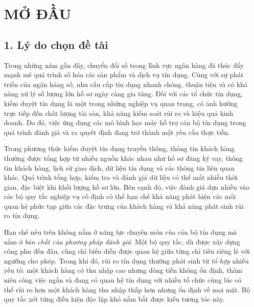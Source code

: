 \chapter*{MỞ ĐẦU}

\section*{1. Lý do chọn đề tài}

Trong những năm gần đây, chuyển đổi số trong lĩnh vực ngân hàng đã thúc đẩy mạnh
mẽ quá trình số hóa các sản phẩm và dịch vụ tín dụng. Cùng với sự phát triển của
ngân hàng số, nhu cầu cấp tín dụng nhanh chóng, thuận tiện và có khả năng xử lý
số lượng lớn hồ sơ ngày càng gia tăng. Đối với các tổ chức tín dụng, kiểm duyệt
tín dụng là một trong những nghiệp vụ quan trọng, có ảnh hưởng trực tiếp đến chất
lượng tài sản, khả năng kiểm soát rủi ro và hiệu quả kinh doanh. Do đó, việc ứng
dụng các mô hình học máy hỗ trợ cán bộ tín dụng trong quá trình đánh giá và ra
quyết định đang trở thành một yêu cầu thực tiễn.

Trong phương thức kiểm duyệt tín dụng truyền thống, thông tin khách hàng thường
được tổng hợp từ nhiều nguồn khác nhau như hồ sơ đăng ký vay, thông tin khách
hàng, lịch sử giao dịch, dữ liệu tín dụng và các thông tin liên quan khác. Quá
trình tổng hợp, kiểm tra và đánh giá dữ liệu có thể mất nhiều thời gian, đặc biệt
khi khối lượng hồ sơ lớn. Bên cạnh đó, việc đánh giá dựa nhiều vào các bộ quy tắc
nghiệp vụ cố định có thể hạn chế khả năng phát hiện các mối quan hệ phức tạp giữa
các đặc trưng của khách hàng và khả năng phát sinh rủi ro tín dụng.

Hạn chế nêu trên không nằm ở năng lực chuyên môn của cán bộ tín dụng mà nằm ở
\textit{bản chất của phương pháp đánh giá}. Một bộ quy tắc, dù được xây dựng công
phu đến đâu, cũng chỉ biểu diễn được quan hệ giữa từng chỉ tiêu riêng lẻ với
ngưỡng cho phép. Trong khi đó, rủi ro tín dụng thường phát sinh từ \textit{tổ
hợp} nhiều yếu tố: một khách hàng có thu nhập cao nhưng dòng tiền không ổn định,
thâm niên công việc ngắn và đang có quan hệ tín dụng với nhiều tổ chức cùng lúc
có thể rủi ro hơn một khách hàng thu nhập thấp hơn nhưng ổn định về mọi mặt. Bộ
quy tắc xét từng điều kiện độc lập khó nắm bắt được kiểu tương tác này.

